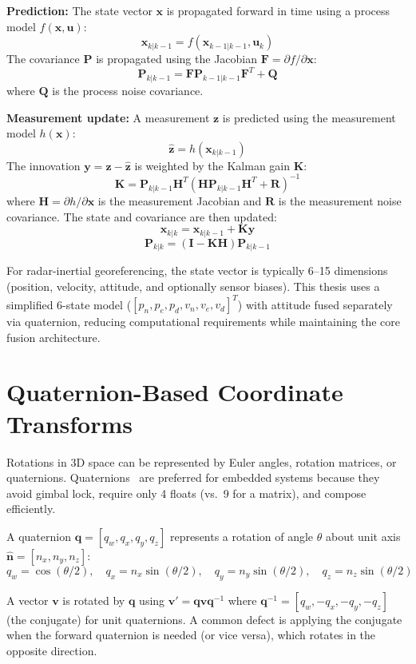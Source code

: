 \textbf{Prediction:} The state vector $\mathbf{x}$ is propagated forward in time using a process model $f(\mathbf{x}, \mathbf{u})$:
$$\mathbf{x}_{k|k-1} = f(\mathbf{x}_{k-1|k-1}, \mathbf{u}_k)$$
The covariance $\mathbf{P}$ is propagated using the Jacobian $\mathbf{F} = \partial f / \partial \mathbf{x}$:
$$\mathbf{P}_{k|k-1} = \mathbf{F} \mathbf{P}_{k-1|k-1} \mathbf{F}^T + \mathbf{Q}$$
where $\mathbf{Q}$ is the process noise covariance.

\textbf{Measurement update:} A measurement $\mathbf{z}$ is predicted using the measurement model $h(\mathbf{x})$:
$$\mathbf{\hat{z}} = h(\mathbf{x}_{k|k-1})$$
The innovation $\mathbf{y} = \mathbf{z} - \mathbf{\hat{z}}$ is weighted by the Kalman gain $\mathbf{K}$:
$$\mathbf{K} = \mathbf{P}_{k|k-1} \mathbf{H}^T (\mathbf{H} \mathbf{P}_{k|k-1} \mathbf{H}^T + \mathbf{R})^{-1}$$
where $\mathbf{H} = \partial h / \partial \mathbf{x}$ is the measurement Jacobian and $\mathbf{R}$ is the measurement noise covariance. The state and covariance are then updated:
$$\mathbf{x}_{k|k} = \mathbf{x}_{k|k-1} + \mathbf{K} \mathbf{y}$$
$$\mathbf{P}_{k|k} = (\mathbf{I} - \mathbf{K} \mathbf{H}) \mathbf{P}_{k|k-1}$$

For radar-inertial georeferencing, the state vector is typically 6--15 dimensions (position, velocity, attitude, and optionally sensor biases). This thesis uses a simplified 6-state model ($[p_n, p_e, p_d, v_n, v_e, v_d]^T$) with attitude fused separately via quaternion, reducing computational requirements while maintaining the core fusion architecture.

\section{Quaternion-Based Coordinate Transforms}

Rotations in 3D space can be represented by Euler angles, rotation matrices, or quaternions. Quaternions~\cite{kuipers1999} are preferred for embedded systems because they avoid gimbal lock, require only 4 floats (vs.\ 9 for a matrix), and compose efficiently.

A quaternion $\mathbf{q} = [q_w, q_x, q_y, q_z]$ represents a rotation of angle $\theta$ about unit axis $\hat{\mathbf{n}} = [n_x, n_y, n_z]$:
$$q_w = \cos(\theta/2), \quad q_x = n_x \sin(\theta/2), \quad q_y = n_y \sin(\theta/2), \quad q_z = n_z \sin(\theta/2)$$

A vector $\mathbf{v}$ is rotated by $\mathbf{q}$ using $\mathbf{v}' = \mathbf{q} \mathbf{v} \mathbf{q}^{-1}$ where $\mathbf{q}^{-1} = [q_w, -q_x, -q_y, -q_z]$ (the conjugate) for unit quaternions. A common defect is applying the conjugate when the forward quaternion is needed (or vice versa), which rotates in the opposite direction.

